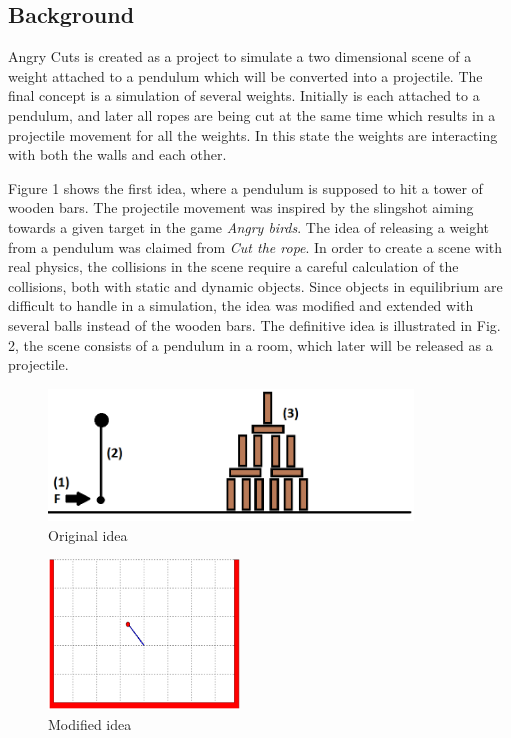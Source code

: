 \documentclass[a4paper,12pt,twoside,english]{article}
\begin{document}
\subsection{Background}
Angry Cuts is created as a project to simulate a two dimensional scene of a weight attached to a pendulum which will be converted into a projectile. 
The final concept is a simulation of several weights. Initially is each attached to a pendulum, and later all ropes are being cut at the same time which results in a projectile movement for all the weights. In this state the weights are interacting with both the walls and each other.

Figure 1 shows the first idea, where a pendulum is supposed to hit a tower of wooden bars. The projectile movement was inspired by the slingshot aiming towards a given target in the game {\itshape Angry birds}. The idea of releasing a weight from a pendulum was claimed from {\itshape Cut the rope}. In order to create a scene with real physics, the collisions in the scene require a careful calculation of the collisions, both with static and dynamic objects. Since objects in equilibrium are difficult to handle in a simulation, the idea was modified and extended with several balls instead of the wooden bars. The definitive idea is illustrated in Fig. 2, the scene consists of a pendulum in a room, which later will be released as a projectile.


\begin{figure}[h]
\includegraphics[height=3.5cm]{bilder/ideasketch.png}
\centering
\caption{Original idea}
\end{figure}
\begin{figure}[h]
\includegraphics[height=4cm]{bilder/Matlab_Pendulum1.png}
\centering
\caption{Modified idea}
\end{figure} 
\end{document}
